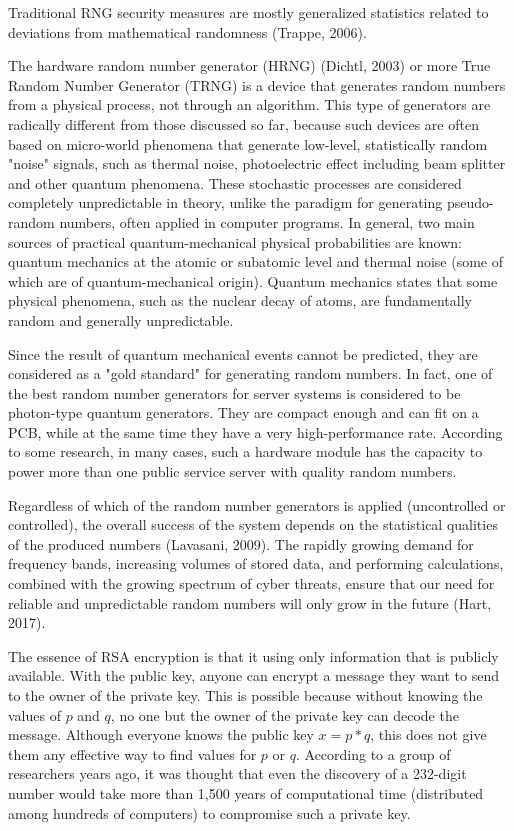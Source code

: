 \documentclass[graybox]{svmult}
\begin{document}
Traditional RNG security measures are mostly generalized statistics related to deviations from mathematical randomness (Trappe, 2006).

The hardware random number generator (HRNG) (Dichtl, 2003) or more True Random Number Generator (TRNG) is a device that generates random numbers from a physical process, not through an algorithm. This type of generators are radically different from those discussed so far, because such devices are often based on micro-world phenomena that generate low-level, statistically random "noise" signals, such as thermal noise, photoelectric effect including beam splitter and other quantum phenomena. These stochastic processes are considered completely unpredictable in theory, unlike the paradigm for generating pseudo-random numbers, often applied in computer programs. In general, two main sources of practical quantum-mechanical physical probabilities are known: quantum mechanics at the atomic or subatomic level and thermal noise (some of which are of quantum-mechanical origin). Quantum mechanics states that some physical phenomena, such as the nuclear decay of atoms, are fundamentally random and generally unpredictable.

Since the result of quantum mechanical events cannot be predicted, they are considered as a "gold standard" for generating random numbers. In fact, one of the best random number generators for server systems is considered to be photon-type quantum generators. They are compact enough and can fit on a PCB, while at the same time they have a very high-performance rate. According to some research, in many cases, such a hardware module has the capacity to power more than one public service server with quality random numbers. 

Regardless of which of the random number generators is applied (uncontrolled or controlled), the overall success of the system depends on the statistical qualities of the produced numbers (Lavasani, 2009). The rapidly growing demand for frequency bands, increasing volumes of stored data, and performing calculations, combined with the growing spectrum of cyber threats, ensure that our need for reliable and unpredictable random numbers will only grow in the future (Hart, 2017). 

The essence of RSA encryption is that it using only information that is publicly available. With the public key, anyone can encrypt a message they want to send to the owner of the private key. This is possible because without knowing the values of $p$ and $q$, no one but the owner of the private key can decode the message. Although everyone knows the public key $x = p * q$, this does not give them any effective way to find values for $p$ or $q$. According to a group of researchers years ago, it was thought that even the discovery of a 232-digit number would take more than 1,500 years of computational time (distributed among hundreds of computers) to compromise such a private key. 
\end{document}
